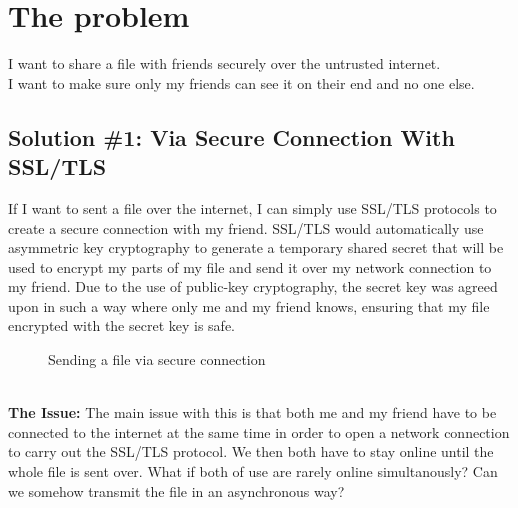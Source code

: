 \documentclass{article}
\begin{document}
\section*{The problem}
\begin{center}
I want to share a file with friends securely over the untrusted internet.\\ I want to make sure only my friends can see it on their end and no one else.
\end{center}

\subsection*{Solution \#1: Via Secure Connection With SSL/TLS}
If I want to sent a file over the internet, I can simply use SSL/TLS protocols to create a secure connection with my friend. SSL/TLS would automatically use asymmetric key cryptography to generate a temporary shared secret that will be used to encrypt my parts of my file and send it over my network connection to my friend. Due to the use of public-key cryptography, the secret key was agreed upon in such a way  where only me and my friend knows, ensuring that my file encrypted with the secret key is safe.

\begin{figure}[!htb]
        \caption{Sending a file via secure connection}
      \end{figure}

\-\\\textbf{The Issue:}
The main issue with this is that both me and my friend have to be connected to the internet at the same time in order to open a network connection to carry out the SSL/TLS protocol. We then both have to stay online until the whole file is sent over. What if both of use are rarely online simultanously? Can we somehow transmit the file in an asynchronous way?
\end{document}
